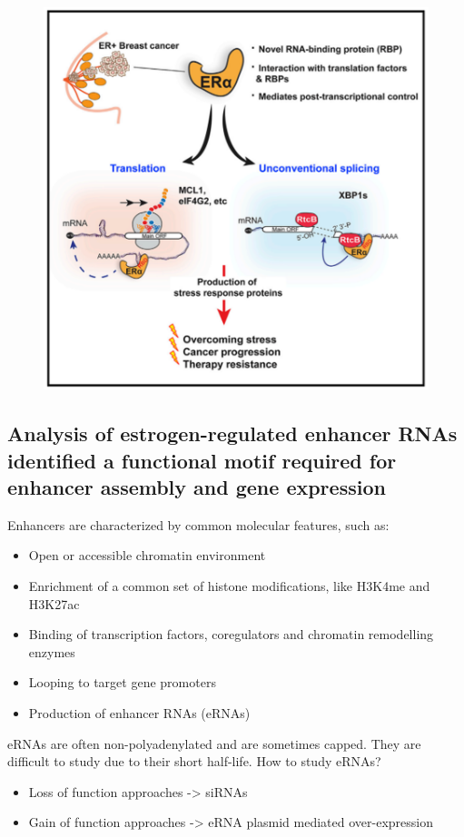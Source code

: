 \begin{figure}
\centering
\includegraphics[width=\textwidth]{../_resources/era.png}
\caption{}
\end{figure}

\subsection{Analysis of estrogen-regulated enhancer RNAs identified a functional motif required for enhancer assembly and gene expression}


Enhancers are characterized by common molecular features, such as: 

\begin{itemize}
\item Open or accessible chromatin environment 
\item Enrichment of a common set of histone modifications, like H3K4me and H3K27ac 
\item Binding of transcription factors, coregulators and chromatin remodelling enzymes 
\item Looping to target gene promoters  
\item Production of enhancer RNAs (eRNAs)
\end{itemize}

eRNAs are often non-polyadenylated and are sometimes capped.  They are difficult to study due to their short half-life. 
How to study eRNAs? 
\begin{itemize}
\item Loss of function approaches -> siRNAs 
\item Gain of function approaches -> eRNA plasmid mediated over-expression
\end{itemize}

